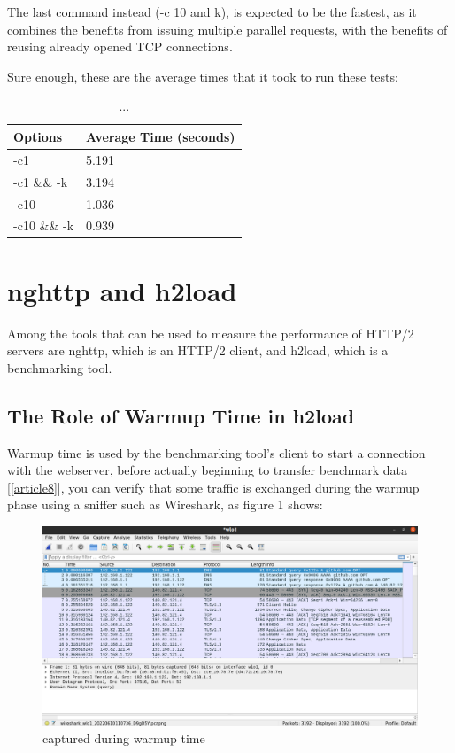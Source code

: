\documentclass[a4paper,10pt]{article}
\begin{document}
The last command instead (-c 10 and k), is expected to be the fastest, as it combines the benefits from issuing multiple parallel requests, with the benefits of reusing already opened TCP connections.

Sure enough, these are the average times that it took to run these tests:




\begin{table}[h!]
\centering
\begin{tabular}{|l|l|}
\hline
Options      & Average Time (seconds) \\ \hline
-c1          & 5.191        \\ \hline
-c1 \&\& -k  & 3.194        \\ \hline
-c10         & 1.036        \\ \hline
-c10 \&\& -k & 0.939        \\ \hline



\end{tabular}

\caption{...}
\label{fig:table3}

\end{table}

\clearpage 


\section{nghttp and h2load}
Among the tools that can be used to measure the performance of HTTP/2 servers are nghttp, which is an HTTP/2 client, and h2load, which is a benchmarking tool.

\subsection{The Role of Warmup Time in h2load}

Warmup time is used by the benchmarking tool's client to start a connection with the 
webserver, before actually beginning to transfer benchmark data [\ref{article8}], you can verify that some traffic is exchanged during the warmup phase using a sniffer such as Wireshark, as figure 1 shows: 

\begin{figure}[h!]
\centering
\includegraphics[scale=0.2]{h2load-wireshark}
\caption{captured during warmup time}
\label{fig:figure1}
\end{figure}
\end{document}
